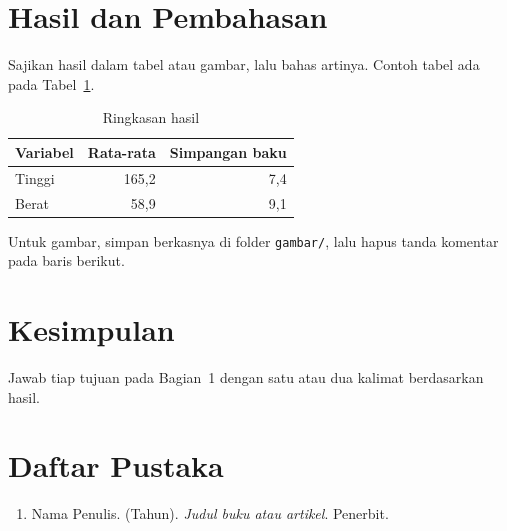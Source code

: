 \documentclass[12pt,a4paper]{article}
\begin{document}
\section{Hasil dan Pembahasan}
Sajikan hasil dalam tabel atau gambar, lalu bahas artinya. Contoh tabel ada pada
Tabel~\ref{tab:ringkasan}.
\begin{table}[H]
	\centering
	\caption{Ringkasan hasil}
	\label{tab:ringkasan}
	\begin{tabular}{lrr}
		\toprule
		Variabel & Rata-rata & Simpangan baku \\
		\midrule
		Tinggi   & 165{,}2   & 7{,}4 \\
		Berat    & 58{,}9    & 9{,}1 \\
		\bottomrule
	\end{tabular}
\end{table}

Untuk gambar, simpan berkasnya di folder \texttt{gambar/}, lalu hapus tanda komentar
pada baris berikut.

\section{Kesimpulan}
Jawab tiap tujuan pada Bagian~1 dengan satu atau dua kalimat berdasarkan hasil.

\section*{Daftar Pustaka}
\begin{enumerate}
	\item Nama Penulis. (Tahun). \textit{Judul buku atau artikel}. Penerbit.
\end{enumerate}
\end{document}

